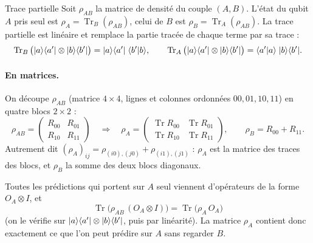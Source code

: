 \begin{definition}{Trace partielle}
Soit $\rho_{AB}$ la matrice de densité du couple $(A,B)$. L'état du qubit $A$ pris seul est
$\rho_A=\operatorname{Tr}_B(\rho_{AB})$, celui de $B$ est $\rho_B=\operatorname{Tr}_A(\rho_{AB})$. La
trace partielle est linéaire et remplace la partie tracée de chaque terme par sa trace :
\[
  \operatorname{Tr}_B\big(|a\rangle\langle a'|\otimes|b\rangle\langle b'|\big)=|a\rangle\langle a'|\;\langle b'|b\rangle,
  \qquad
  \operatorname{Tr}_A\big(|a\rangle\langle a'|\otimes|b\rangle\langle b'|\big)=\langle a'|a\rangle\;|b\rangle\langle b'|.
\]
\end{definition}

\paragraph{En matrices.} On découpe $\rho_{AB}$ (matrice $4\times4$, lignes et colonnes ordonnées
$00,01,10,11$) en quatre blocs $2\times2$ :
\[
  \rho_{AB}=\begin{pmatrix}R_{00}&R_{01}\\R_{10}&R_{11}\end{pmatrix}
  \quad\Longrightarrow\quad
  \rho_A=\begin{pmatrix}\operatorname{Tr}R_{00}&\operatorname{Tr}R_{01}\\
                        \operatorname{Tr}R_{10}&\operatorname{Tr}R_{11}\end{pmatrix},
  \qquad
  \rho_B=R_{00}+R_{11}.
\]
Autrement dit $(\rho_A)_{ij}=\rho_{(i0),(j0)}+\rho_{(i1),(j1)}$ : $\rho_A$ est la matrice des traces
des blocs, et $\rho_B$ la somme des deux blocs diagonaux.

\begin{remarque}
Toutes les prédictions qui portent sur $A$ seul viennent d'opérateurs de la forme $O_A\otimes I$, et
\[
  \operatorname{Tr}\big(\rho_{AB}\,(O_A\otimes I)\big)=\operatorname{Tr}\big(\rho_A\,O_A\big)
\]
(on le vérifie sur $|a\rangle\langle a'|\otimes|b\rangle\langle b'|$, puis par linéarité). La matrice $\rho_A$
contient donc exactement ce que l'on peut prédire sur $A$ sans regarder $B$.
\end{remarque}

